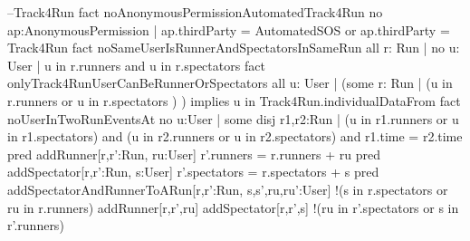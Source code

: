 \documentclass[a4paper]{article}
\begin{document}
{{\newline }
\newline 
\newline --Track4Run
\newline 
\newline fact noAnonymousPermissionAutomatedTrack4Run{
\newline 	no ap:AnonymousPermission | ap.thirdParty = AutomatedSOS or ap.thirdParty = Track4Run 
\newline }
\newline 
\newline fact noSameUserIsRunnerAndSpectatorsInSameRun{
\newline all r: Run | no u: User | u in r.runners and u in r.spectators
\newline }
\newline 
\newline fact onlyTrack4RunUserCanBeRunnerOrSpectators{
\newline all u: User | (some r: Run | (u in r.runners or u in r.spectators ) ) implies u in Track4Run.individualDataFrom
\newline }
\newline 
\newline fact noUserInTwoRunEventsAt{
\newline 	no u:User | some disj r1,r2:Run | (u in r1.runners or u in r1.spectators) and (u in r2.runners or u in r2.spectators) and r1.time = r2.time
\newline }
\newline 
\newline pred addRunner[r,r':Run, ru:User]{
\newline 	r'.runners = r.runners + ru
\newline }
\newline 
\newline pred addSpectator[r,r':Run, s:User]{
\newline 	r'.spectators = r.spectators + s
\newline }
\newline 
\newline pred addSpectatorAndRunnerToARun[r,r':Run, s,s',ru,ru':User]{
\newline 	!(s in r.spectators or ru in r.runners)
\newline 	addRunner[r,r',ru]
\newline 	addSpectator[r,r',s]
\newline 
\newline 	!(ru in r'.spectators or s in r'.runners)
\newline }
}
\end{document}
